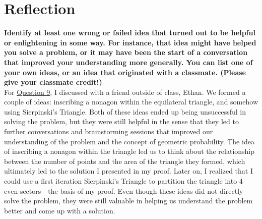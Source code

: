 \documentclass[article, 12pt]{article}
\theoremstyle{definition}
\begin{document}
\section{Reflection}
\textbf{Identify at least one wrong or failed idea that turned out to be helpful or enlightening in some way. For instance, that idea might have helped you solve a problem, or it may have been the start of a conversation that improved your understanding more generally. You can list one of your own ideas, or an idea that originated with a classmate. (Please give your classmate credit!)} \\
For \hyperref[question:equilateral]{Question 9}, I discussed with a friend outside of class, Ethan. We formed a couple of ideas: inscribing a nonagon within the equilateral triangle, and somehow using Sierpinski's Triangle. Both of these ideas ended up being unsuccessful in solving the problem, but they were still helpful in the sense that they led to further conversations and brainstorming sessions that improved our understanding of the problem and the concept of geometric probability. The idea of inscribing a nonagon within the triangle led us to think about the relationship between the number of points and the area of the triangle they formed, which ultimately led to the solution I presented in my proof. Later on, I realized that I could use a first iteration Sierpinski's Triangle to partition the triangle into 4 even sectors---the basis of my proof. Even though these ideas did not directly solve the problem, they were still valuable in helping us understand the problem better and come up with a solution.
\end{document}
